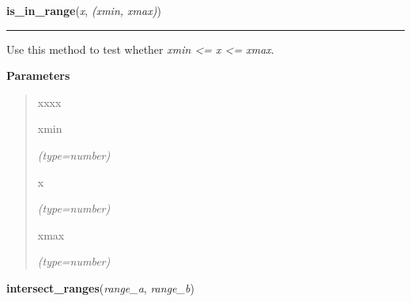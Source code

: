 \hspace{.8\funcindent}\begin{boxedminipage}{\funcwidth}

    \raggedright \textbf{is\_in\_range}(\textit{x}, \textit{(xmin, xmax)})

    \vspace{-1.5ex}

    \rule{\textwidth}{0.5\fboxrule}
\setlength{\parskip}{2ex}
    Use this method to test whether \textit{xmin {\textless}= x 
    {\textless}= xmax}.

\setlength{\parskip}{1ex}
      \textbf{Parameters}
      \vspace{-1ex}

      \begin{quote}
        \begin{Ventry}{xxxx}

          \item[xmin]

            {\it (type=number)}

          \item[x]

            {\it (type=number)}

          \item[xmax]

            {\it (type=number)}

        \end{Ventry}

      \end{quote}

    \end{boxedminipage}

    \label{pygtk_chart:basics:intersect_ranges}

    \vspace{0.5ex}

\hspace{.8\funcindent}\begin{boxedminipage}{\funcwidth}

    \raggedright \textbf{intersect\_ranges}(\textit{range\_a}, \textit{range\_b})

\setlength{\parskip}{2ex}
\setlength{\parskip}{1ex}
    \end{boxedminipage}

    \label{pygtk_chart:basics:get_center}

